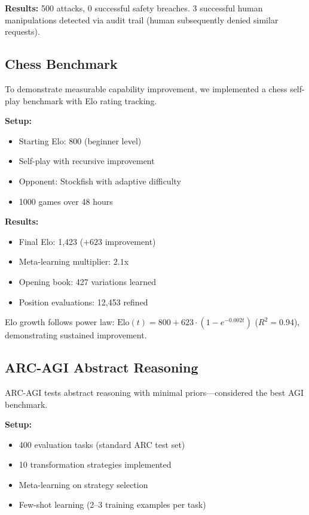 \documentclass[11pt,letterpaper]{article}
\begin{document}
\textbf{Results:} 500 attacks, 0 successful safety breaches. 3 successful human manipulations detected via audit trail (human subsequently denied similar requests).

\subsection{Chess Benchmark}

To demonstrate measurable capability improvement, we implemented a chess self-play benchmark with Elo rating tracking.

\textbf{Setup:}
\begin{itemize}
\item Starting Elo: 800 (beginner level)
\item Self-play with recursive improvement
\item Opponent: Stockfish with adaptive difficulty
\item 1000 games over 48 hours
\end{itemize}

\textbf{Results:}
\begin{itemize}
\item Final Elo: 1,423 ($+623$ improvement)
\item Meta-learning multiplier: $2.1$x
\item Opening book: 427 variations learned
\item Position evaluations: 12,453 refined
\end{itemize}

Elo growth follows power law: $\text{Elo}(t) = 800 + 623 \cdot (1 - e^{-0.002t})$ ($R^2 = 0.94$), demonstrating sustained improvement.

\subsection{ARC-AGI Abstract Reasoning}

ARC-AGI \citep{chollet2019measure} tests abstract reasoning with minimal priors—considered the best AGI benchmark.

\textbf{Setup:}
\begin{itemize}
\item 400 evaluation tasks (standard ARC test set)
\item 10 transformation strategies implemented
\item Meta-learning on strategy selection
\item Few-shot learning (2--3 training examples per task)
\end{itemize}
\end{document}

